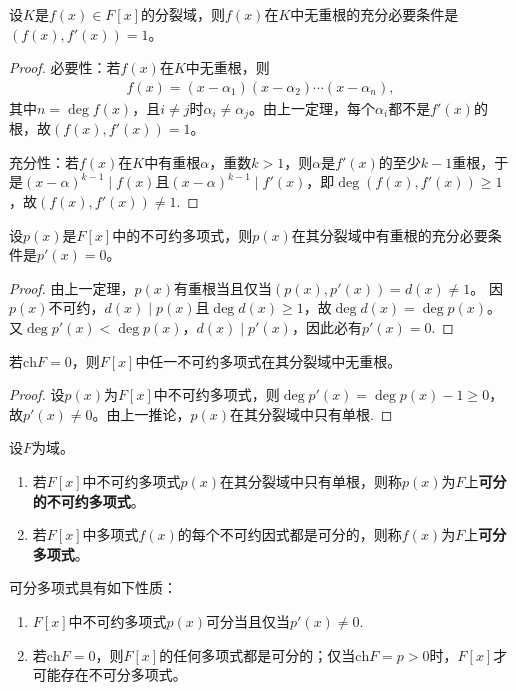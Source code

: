 \documentclass[../../main.tex]{subfiles}%
\begin{document}
\begin{theorem}
设$K$是$f(x)\in F[x]$的分裂域，则$f(x)$在$K$中无重根的充分必要条件是$(f(x),f'(x))=1$。
\end{theorem}

\begin{proof}
必要性：若$f(x)$在$K$中无重根，则
\begin{align*}
f(x)=(x-\alpha_1)(x-\alpha_2)\cdots(x-\alpha_n),
\end{align*}
其中$n=\deg f(x)$，且$i\neq j$时$\alpha_i\neq\alpha_j$。由上一定理，每个$\alpha_i$都不是$f'(x)$的根，故$(f(x),f'(x))=1$。

充分性：若$f(x)$在$K$中有重根$\alpha$，重数$k>1$，则$\alpha$是$f'(x)$的至少$k-1$重根，于是$(x-\alpha)^{k-1}\mid f(x)$且$(x-\alpha)^{k-1}\mid f'(x)$，即$\deg(f(x),f'(x))\geqslant1$，故$(f(x),f'(x))\neq1$.
\end{proof}

\begin{corollary}
设$p(x)$是$F[x]$中的不可约多项式，则$p(x)$在其分裂域中有重根的充分必要条件是$p'(x)=0$。
\end{corollary}

\begin{proof}
由上一定理，$p(x)$有重根当且仅当$(p(x),p'(x))=d(x)\neq1$。
因$p(x)$不可约，$d(x)\mid p(x)$且$\deg d(x)\geqslant1$，故$\deg d(x)=\deg p(x)$。
又$\deg p'(x)<\deg p(x)$，$d(x)\mid p'(x)$，因此必有$p'(x)=0$.
\end{proof}

\begin{corollary}
若$\mathrm{ch}F=0$，则$F[x]$中任一不可约多项式在其分裂域中无重根。
\end{corollary}

\begin{proof}
设$p(x)$为$F[x]$中不可约多项式，则$\deg p'(x)=\deg p(x)-1\geqslant0$，故$p'(x)\neq0$。由上一推论，$p(x)$在其分裂域中只有单根.
\end{proof}

\begin{definition}
设$F$为域。
\begin{enumerate}[(1)]
\item 若$F[x]$中不可约多项式$p(x)$在其分裂域中只有单根，则称$p(x)$为$F$上\textbf{可分的不可约多项式}。
\item 若$F[x]$中多项式$f(x)$的每个不可约因式都是可分的，则称$f(x)$为$F$上\textbf{可分多项式}。
\end{enumerate}
\end{definition}

\begin{remark}
可分多项式具有如下性质：
\begin{enumerate}[(1)]
\item $F[x]$中不可约多项式$p(x)$可分当且仅当$p'(x)\neq0$.
\item 若$\mathrm{ch}F=0$，则$F[x]$的任何多项式都是可分的；仅当$\mathrm{ch}F=p>0$时，$F[x]$才可能存在不可分多项式。
\end{enumerate}
\end{remark}
\end{document}
